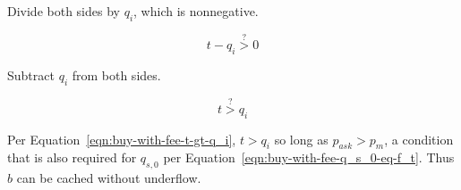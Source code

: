 Divide both sides by $q_i$, which is nonnegative.

\begin{equation*}
	t - q_i \stackrel{?}{>} 0
\end{equation*}

Subtract $q_i$ from both sides.

\begin{equation*}
	t \stackrel{?}{>} q_i
\end{equation*}

Per Equation~\ref{eqn:buy-with-fee-t-gt-q_i}, $t > q_i$ so long as $p_{ask} > p_{m}$, a
condition that is also required for $q_{s, 0}$ per
Equation~\ref{eqn:buy-with-fee-q_s_0-eq-f_t}. Thus $b$ can be cached without underflow.
